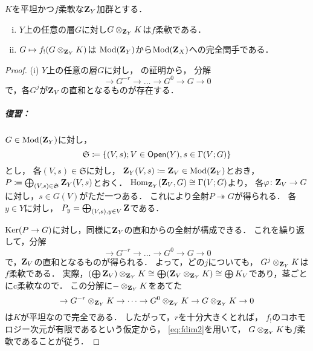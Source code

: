 \begin{LMM}\label{LMM:PV-flat}
    \(K\)を平坦かつ\(f\)柔軟な\(\mathbf{Z}_Y\)加群とする．
    \begin{enumerate}[(i)]
        \item \(Y\)上の任意の層\(G\)に対し\(G\otimes_{\mathbf{Z}_Y}K\)は\(f\)柔軟である．
        \item \(G\mapsto f_!(G\otimes_{\mathbf{Z}_Y}K)\)は
        \(\mathop{\mathrm{Mod}}\nolimits(\mathbf{Z}_Y)\)から\(\mathop{\mathrm{Mod}}\nolimits(\mathbf{Z}_X)\)への完全関手である．
    \end{enumerate}
\end{LMM}
\begin{proof}
    (i) 
    \(Y\)上の任意の層\(G\)に対し，
    \cite[Prop.2.4.12]{KS90}の証明から，
    分解
    \[
        \to{G^{-r}}\to\dots\to{G^{0}}\to{G}\to0
    \]
    で，各\(G^{j}\)が\(\mathbf{Z}_V\)の直和となるものが存在する．

    \subparagraph*{復習：}
    \(G\in\mathop{\mathrm{Mod}}\nolimits(\mathbf{Z}_Y)\)に対し，
    \[
        \mathfrak{S}\coloneqq\{(V,s);V\in\mathop{\textsf{Open}}\nolimits(Y),s\in\Gamma(V;G)\}
    \]とし，
    各\((V,s)\in\mathfrak{S}\)に対し，
    \(\mathbf{Z}_Y(V,s)\coloneqq\mathbf{Z}_V\in\mathop{\mathrm{Mod}}\nolimits(\mathbf{Z}_Y)\)とおき，
    \(P\coloneqq\bigoplus_{(V,s)\in\mathfrak{S}}\mathbf{Z}_Y(V,s)\)とおく．
    \(\mathop{\mathrm{Hom}}\nolimits_{\mathbf{Z}_Y}(\mathbf{Z}_V,G)\cong\Gamma(V;G)\)より，
    各\(\varphi\colon\mathbf{Z}_V\to{G}\)に対し，\(s\in G(V)\)がただ一つある．
    これにより全射\(P\twoheadrightarrow G\)が得られる．
    各\(y\in Y\)に対し，
    \(P_y=\bigoplus_{(V,s),\\y\in V}\mathbf{Z}\)である．

    \(\mathop{\mathrm{Ker}}\nolimits(P\to G)\)に対し，同様に\(\mathbf{Z}_Y\)の直和からの全射が構成できる．
    これを繰り返して，分解
    \[
        \to{G^{-r}}\to\dots\to{G^{0}}\to{G}\to0
    \]
    で，\(\mathbf{Z}_V\)の直和となるものが得られる．
    よって，どの\(j\)についても，
    \(G^j\otimes_{\mathbf{Z}_Y}K\)は\(f\)柔軟である．
    実際，\(
        (\bigoplus\mathbf{Z}_V)\otimes_{\mathbf{Z}_Y}K\cong 
        \bigoplus(\mathbf{Z}_V\otimes_{\mathbf{Z}_Y}K)\cong\bigoplus{K_V}
    \)であり，茎ごとにc柔軟なので．
    この分解に\(-\otimes_{\mathbf{Z}_Y}K\)をあてた
    \[
        \to{G^{-r}}\otimes_{\mathbf{Z}_Y}K\to\dots
        \to{G^{0}}\otimes_{\mathbf{Z}_Y}K\to{G}\otimes_{\mathbf{Z}_Y}K\to0
    \]
    は\(K\)が平坦なので完全である．
    したがって，\(r\)を十分大きくとれば，
    \(f_!\)のコホモロジー次元が有限であるという仮定から，
    \eqref{eq:fdim2}を用いて，
    \({G}\otimes_{\mathbf{Z}_Y}K\)も\(f\)柔軟であることが従う．


\end{proof}
